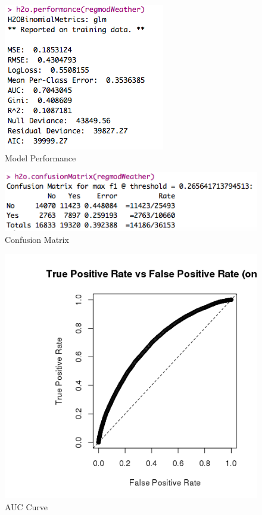 \documentclass[12pt,twoside]{amherstthesis}
\begin{document}
  \begin{figure}[htbp]
  \centering
  \includegraphics[scale = 0.7,angle = 0]{figure/regmodPerformWeather.png}
  \caption[Model Performance]{\normalsize{Model Performance}}
  \label{fig:weath1}
  \end{figure}
  
  \begin{figure}[htbp]
  \centering
  \includegraphics[scale = 0.8,angle = 0]{figure/regModWeather2.png}
  \caption[Confusion Matrix]{\normalsize{Confusion Matrix}}
  \label{fig:weath2}
  \end{figure}
  
  \begin{figure}[htbp]
  \centering
  \includegraphics[scale = 0.8,angle = 0]{figure/LogWeatherROC.png}
  \caption[AUC Curve]{\normalsize{AUC Curve}}
  \label{fig:weath3}
  \end{figure}
  
\end{document}
